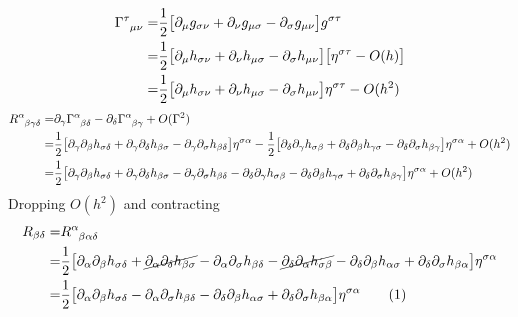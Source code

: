 \documentclass[]{article}
\newcommand\numberthis{\addtocounter{equation}{1}\tag{\theequation}}
\begin{document}
{\begin{appendices}
	\begin{align*}
		\Gamma\indices{^{\tau}_{\mu\nu}} =&\frac{1}{2} \big[ \partial_\mu g_{\sigma\nu} + \partial_\nu g_{\mu\sigma} - \partial_\sigma g_{\mu\nu}\big] g^{\sigma\tau}\\
		=& \frac{1}{2} \big[ \partial_\mu h_{\sigma\nu} + \partial_\nu h_{\mu\sigma} - \partial_\sigma h_{\mu\nu}\big] \big[\eta^{\sigma\tau }- O(h)\big]\\
		=& \frac{1}{2} \big[ \partial_\mu h_{\sigma\nu} + \partial_\nu h_{\mu\sigma} - \partial_\sigma h_{\mu\nu}\big] \eta^{\sigma\tau }- O(h^2)
	\end{align*}
	\begin{align*}
		R\indices{^\alpha_{\beta\gamma\delta}} =& \partial_\gamma\Gamma\indices{^\alpha_{\beta\delta}}-\partial_\delta\Gamma\indices{^\alpha_{\beta\gamma}} + O(\Gamma^2)\\
		=& \frac{1}{2} \big[ \partial_\gamma\partial_\beta h_{\sigma\delta} + \partial_\gamma\partial_\delta h_{\beta\sigma} - \partial_\gamma\partial_\sigma h_{\beta\delta}\big] \eta^{\sigma\alpha }- \frac{1}{2} \big[ \partial_\delta\partial_\gamma h_{\sigma\beta} + \partial_\delta\partial_\beta h_{\gamma\sigma} - \partial_\delta\partial_\sigma h_{\beta\gamma}\big] \eta^{\sigma\alpha }+ O(h^2)\\
		=& \frac{1}{2} \big[ \partial_\gamma\partial_\beta h_{\sigma\delta} + \partial_\gamma\partial_\delta h_{\beta\sigma} - \partial_\gamma\partial_\sigma h_{\beta\delta} - \partial_\delta\partial_\gamma h_{\sigma\beta} - \partial_\delta\partial_\beta h_{\gamma\sigma} + \partial_\delta\partial_\sigma h_{\beta\gamma}\big] \eta^{\sigma\alpha }+ O(h^2)
	\end{align*}
	Dropping $O(h^2)$ and contracting
	\begin{align*}
	R_{\beta\delta} =& 	R\indices{^\alpha_{\beta\alpha\delta}}\\
	=& \frac{1}{2} \big[ \partial_\alpha\partial_\beta h_{\sigma\delta} + \cancel{\partial_\alpha\partial_\delta h_{\beta\sigma}} - \partial_\alpha\partial_\sigma h_{\beta\delta} - \cancel{\partial_\delta\partial_\alpha h_{\sigma\beta}} - \partial_\delta\partial_\beta h_{\alpha\sigma} + \partial_\delta\partial_\sigma h_{\beta\alpha}\big] \eta^{\sigma\alpha }
	\\
	=& \frac{1}{2} \big[ \partial_\alpha\partial_\beta h_{\sigma\delta} - \partial_\alpha\partial_\sigma h_{\beta\delta} -  \partial_\delta\partial_\beta h_{\alpha\sigma} + \partial_\delta\partial_\sigma h_{\beta\alpha}\big] \eta^{\sigma\alpha } \numberthis \label{eq:linearized}\\

\end{align*}
\end{appendices}}
\end{document}
